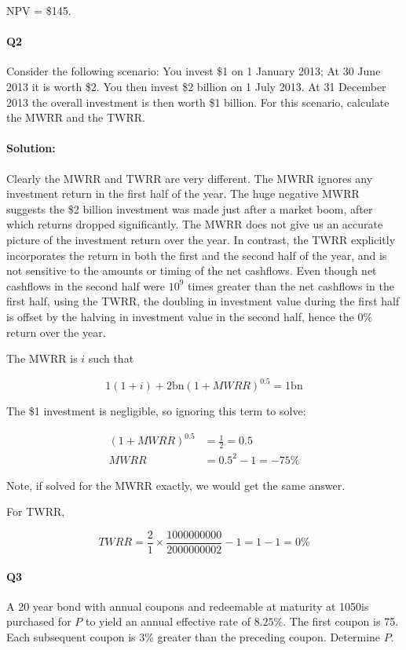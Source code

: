 \documentclass[a4paper, 11pt, twoside]{article}
\begin{document}
NPV = \$145.

\paragraph{Q2} Consider the following scenario: You invest \$1 on 1 January 2013; At 30 June 2013 it is worth \$2. You then invest \$2 billion on 1 July 2013. At 31 December 2013 the overall investment is then worth \$1 billion. For this scenario, calculate the MWRR and the TWRR.

\paragraph{Solution:} Clearly the MWRR and TWRR are very different. The MWRR ignores any investment return in the first half of the year. The huge negative MWRR suggests the \$2 billion investment was made just after a market boom, after which returns dropped significantly. The MWRR does not give us an accurate picture of the investment return over the year. In contrast, the TWRR explicitly incorporates the return in  both the first and the second half of the year, and is not sensitive to the  amounts or timing of the net cashflows. Even though net cashflows in the second half were $10^9$ times greater than the net cashflows in the first half, using the TWRR, the doubling in investment value during the first half is offset by the halving in investment value in the second half, hence the 0\% return over the year.

The MWRR is $i$ such that

\[1(1+i)+2\text{bn}(1+MWRR)^{0.5}=1\text{bn}\]

The \$1 investment is negligible, so ignoring this term to solve:

\[\begin{split}
(1+MWRR)^{0.5}&=\frac{1}{2}=0.5\\
MWRR&=0.5^2-1=-75\%
\end{split}
\]

Note, if solved for the MWRR exactly, we would get the same answer.

For TWRR,

\[TWRR = \frac{2}{1}\times\frac{1000000000}{2000000002}-1=1-1=0\%\]

\paragraph{Q3} A 20 year bond with annual coupons and redeemable at maturity at 1050is purchased for $P$ to yield an annual effective rate of $8.25\%$. The first coupon is 75. Each subsequent coupon is $3\%$ greater than the preceding coupon. Determine $P$.
\end{document}
